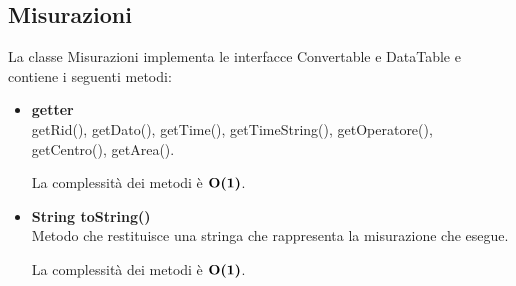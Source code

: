 \documentclass[a4paper, 12pt]{scrreprt}
\begin{document}
			\subsection{Misurazioni}
			La classe Misurazioni implementa le interfacce Convertable e DataTable e contiene i seguenti metodi:\\
			\begin{itemize}
				\item \textbf{getter}
				\\getRid(), getDato(), getTime(), getTimeString(), getOperatore(), getCentro(), getArea().
				
				La complessit\`a dei metodi \`e $\mathbf{O}\textbf{(1)}$.
				
				\item \textbf{String toString()}
				\\Metodo che restituisce una stringa che rappresenta la misurazione che esegue.
				
				La complessit\`a dei metodi \`e $\mathbf{O}\textbf{(1)}$.
				
			\end{itemize}
\end{document}
